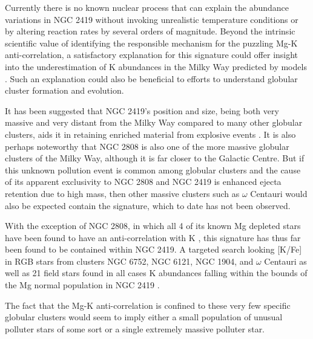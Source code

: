 \documentclass[a4paper,fleqn,usenatbib]{mnras}
\begin{document}
Currently there is no known nuclear process that can explain the abundance variations in NGC 2419 without invoking unrealistic temperature conditions or by altering reaction rates by several orders of magnitude. Beyond the intrinsic scientific value of identifying the responsible mechanism for the puzzling Mg-K anti-correlation, a satisfactory explanation for this signature could offer insight into the underestimation of K abundances in the Milky Way predicted by models \citep{kobayashi2011}. Such an explanation could also be beneficial to efforts to understand globular cluster formation and evolution.










It has been suggested that NGC 2419's position and size, being both very massive and very distant from the Milky Way compared to many other globular clusters, aids it in retaining enriched material from explosive events \citep{mucciarelli2012}. It is also perhaps noteworthy that NGC 2808 is also one of the more massive globular clusters of the Milky Way, although it is far closer to the Galactic Centre. But if this unknown pollution event is common among globular clusters and the cause of its apparent exclusivity to NGC 2808 and NGC 2419 is enhanced ejecta retention due to high mass, then other massive clusters such as $\omega$ Centauri would also be expected contain the signature, which to date has not been observed.


With the exception of NGC 2808, in which all 4 of its known Mg depleted stars have been found to have an anti-correlation with K \citep{mucciarelli2015}, this signature has thus far been found to be contained within NGC 2419. A  targeted search looking [K/Fe] in RGB stars from clusters NGC 6752, NGC 6121, NGC 1904, and $\omega$ Centauri as well as 21 field stars found in all cases K abundances falling within the bounds of the Mg normal population in NGC 2419 \citep{carretta2013}.



The fact that the Mg-K anti-correlation is confined to these very few specific globular clusters would seem to imply either a small population  of unusual polluter stars of some sort or a single extremely massive polluter star.
\end{document}
